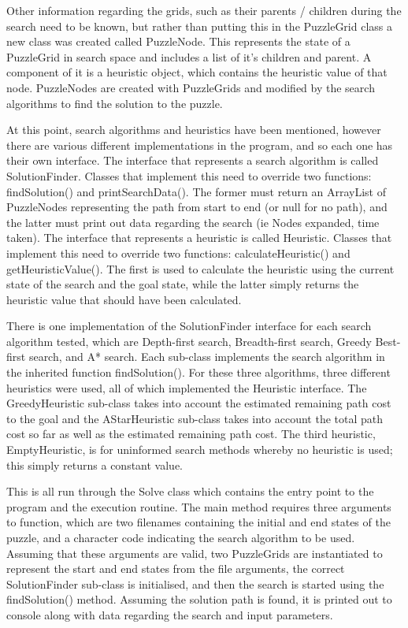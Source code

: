 \documentclass[12pt]{article}
\begin{document}
Other information regarding the grids, such as their parents / children during the search need to be known, but rather than putting this in the PuzzleGrid class a new class was created called PuzzleNode. This represents the state of a PuzzleGrid in search space and includes a list of it's children and parent. A component of it is a heuristic object, which contains the heuristic value of that node. PuzzleNodes are created with PuzzleGrids and modified by the search algorithms to find the solution to the puzzle.

At this point, search algorithms and heuristics have been mentioned, however there are various different implementations in the program, and so each one has their own interface. The interface that represents a search algorithm is called SolutionFinder. Classes that implement this need to override two functions: findSolution() and printSearchData(). The former must return an ArrayList of PuzzleNodes representing the path from start to end (or null for no path), and the latter must print out data regarding the search (ie Nodes expanded, time taken). The interface that represents a heuristic is called Heuristic. Classes that implement this need to override two functions: calculateHeuristic() and getHeuristicValue(). The first is used to calculate the heuristic using the current state of the search and the goal state, while the latter simply returns the heuristic value that should have been calculated.

There is one implementation of the SolutionFinder interface for each search algorithm tested, which are Depth-first search, Breadth-first search, Greedy Best-first search, and A* search. Each sub-class implements the search algorithm in the inherited function findSolution(). For these three algorithms, three different heuristics were used, all of which implemented the Heuristic interface. The GreedyHeuristic sub-class takes into account the estimated remaining path cost to the goal and the AStarHeuristic sub-class takes into account the total path cost so far as well as the estimated remaining path cost. The third heuristic, EmptyHeuristic, is for uninformed search methods whereby no heuristic is used; this simply returns a constant value.

This is all run through the Solve class which contains the entry point to the program and the execution routine. The main method requires three arguments to function, which are two filenames containing the initial and end states of the puzzle, and a character code indicating the search algorithm to be used. Assuming that these arguments are valid, two PuzzleGrids are instantiated to represent the start and end states from the file arguments, the correct SolutionFinder sub-class is initialised, and then the search is started using the findSolution() method. Assuming the solution path is found, it is printed out to console along with data regarding the search and input parameters.
\end{document}
